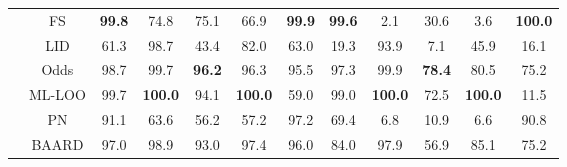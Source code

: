 \documentclass[varwidth=\maxdimen]{standalone}
\begin{document}
\begin{table}
\begin{tabular}{c|c|ccccc|ccccc}
                                                   & FS                                                    & \textbf{99.8}                         & 74.8                              & 75.1                         & 66.9                                  & \textbf{99.9}                        & \textbf{99.6}                & 2.1                       & 30.6                       & 3.6                       & \textbf{100.0}             \\
                                                   & LID                                                   & {\color[HTML]{DC257F}61.3}            & 98.7                              & 43.4                         & 82.0                                  & 63.0                                 & {\color[HTML]{DC257F}19.3}   & 93.9                      & 7.1                        & 45.9                      & 16.1                       \\
                                                   & Odds                                                  & 98.7                                  & 99.7                              & \textbf{96.2}                & 96.3                                  & 95.5                                 & 97.3                         & 99.9                      & \textbf{78.4}              & 80.5                      & 75.2                       \\
                                                   & ML-LOO                                                & 99.7                                  & \textbf{100.0}                    & 94.1                         & \textbf{100.0}                        & {\color[HTML]{DC257F}59.0}           & 99.0                         & \textbf{100.0}            & 72.5                       & \textbf{100.0}            & {\color[HTML]{DC257F}11.5} \\
                                                   & PN                                                    & 91.1                                  & 63.6                              & 56.2                         & 57.2                                  & 97.2                                 & 69.4                         & 6.8                       & 10.9                       & 6.6                       & 90.8                       \\
                                                   & BAARD                                                 & 97.0                                  & 98.9                              & 93.0                         & 97.4                                  & 96.0                                 & 84.0                         & 97.9                      & 56.9                       & 85.1                      & 75.2                       \\

\end{tabular}
\end{table}
\end{document}
